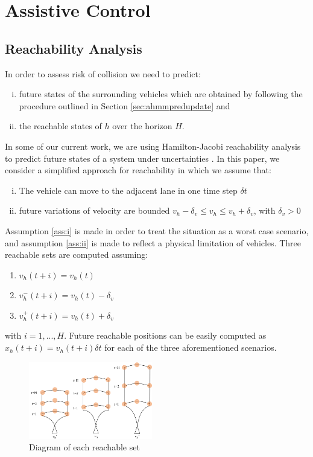 \documentclass[letterpaper, 10 pt, conference]{ieeeconf}  %
\begin{document}
\section{Assistive Control} \label{sec:adapt}


\subsection{Reachability Analysis}

In order to assess risk of collision we need to predict:
\begin{enumerate}[i.]
\item future states of the surrounding vehicles which are obtained by following the procedure outlined in Section \ref{sec:ahmmpredupdate} and
\item the reachable states of $h$ over the horizon $H$.
\end{enumerate}
In some of our current work, we are using Hamilton-Jacobi reachability analysis to predict future states of a system under uncertainties \cite{esen}. In this paper, we consider a simplified approach for reachability in which we assume that:
\begin{enumerate}[i.]
\item The vehicle can move to the adjacent lane in one time step $\delta t$ \label{ass:i}
\item future variations of velocity are bounded $v_h-\delta_v \leq v_h\leq v_h+\delta_v$, with $\delta_v>0$ \label{ass:ii}
\end{enumerate}
Assumption \ref{ass:i} is made in order to treat the situation as a worst case scenario, and assumption \ref{ass:ii} is made to reflect a physical limitation of vehicles.
Three reachable sets are computed assuming:
\begin{enumerate}
    \item $v_h(t+i)=v_h(t)$
    \item $v_{h}^-(t+i)=v_h(t)-\delta_v$
    \item $v_{h}^+(t+i)=v_h(t)+\delta_v$
\end{enumerate} with $i=1,...,H$. Future reachable positions can be easily computed as $x_h(t+i)=v_h(t+i)\delta t$ for each of the three aforementioned scenarios.  

\begin{figure}[ht!]
    \includegraphics[width=0.48\textwidth]{input.png}
    \caption{Diagram of each reachable set}
    \label{fig:reach}
\end{figure}
\end{document}
